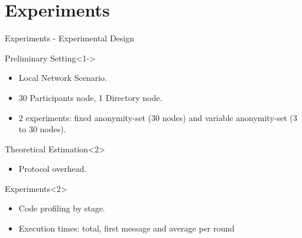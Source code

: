 \section{Experiments}

\begin{frame}{Experiments - Experimental Design}
    
    \begin{block}{Preliminary Setting}<1->
        \begin{itemize}
            \item Local Network Scenario.
            \item 30 Participants node, 1 Directory node.
            \item 2 experiments: fixed anonymity-set (30 nodes) and variable anonymity-set (3 to 30 nodes).
        \end{itemize}
    \end{block}
    
    \begin{block}{Theoretical Estimation}<2>
        \begin{itemize}
            \item Protocol overhead.
        \end{itemize}
    \end{block}
    
    \begin{block}{Experiments}<2>
        \begin{itemize}
            \item Code profiling by stage.
            \item Execution times: total, first message and average per round
        \end{itemize}
    \end{block}
    
\end{frame}